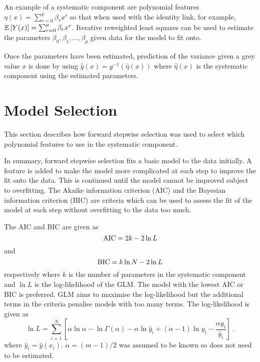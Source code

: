 An example of a systematic component are polynomial features $\eta(x)=\sum_{r=0}^{p}\beta_r x^{r}$ so that when used with the identity link, for example, $\operatorname{\mathbb{E}}\left[Y(x)\right] = \sum_{r=0}^{p}\beta_r x^{r}$. Iterative reweighted least squares \citep{friedman2001elements} can be used to estimate the parameters $\beta_0, \beta_1, \ldots, \beta_{p}$ given data for the model to fit onto.

Once the parameters have been estimated, prediction of the variance given a grey value $x$ is done by using $\widehat{y}(x) = g^{-1}(\widehat{\eta}(x))$ where $\widehat{\eta}(x)$ is the systematic component using the estimated parameters.

\section{Model Selection}

This section describes how forward stepwise selection \citep{efroymson1960multiple, friedman2001elements} was used to select which polynomial features to use in the systematic component.

In summary, forward stepwise selection fits a basic model to the data initially. A feature is added to make the model more complicated at each step to improve the fit onto the data. This is continued until the model cannot be improved subject to overfitting. The Akaike information criterion (AIC) \citep{akaike1974new, friedman2001elements} and the Bayesian information criterion (BIC) \citep{schwarz1978estimating, friedman2001elements} are criteria which can be used to assess the fit of the model at each step without overfitting to the data too much.

The AIC and BIC are given as
\begin{equation}
\mathrm{AIC} = 2k-2\ln L
\end{equation}
and
\begin{equation}
\mathrm{BIC} = k\ln N - 2\ln L
\end{equation}
respectively where $k$ is the number of parameters in the systematic component and $\ln L$ is the log-likelihood of the GLM. The model with the lowest AIC or BIC is preferred. GLM aims to maximise the log-likelihood but the additional terms in the criteria penalise models with too many terms. The log-likelihood is given as
\begin{equation}
  \ln L = \sum_{i=1}^N \left[
    \alpha\ln\alpha
    -\ln\Gamma(\alpha)
    -\alpha\ln \widehat{y}_i
    +(\alpha-1)\ln y_i
    -\frac{\alpha y_i}{\widehat{y}_i}
  \right]
  \ .
\end{equation}
where $\widehat{y}_i=\widehat{y}(x_i)$. $\alpha=(m-1)/2$ was assumed to be known so does not need to be estimated.

